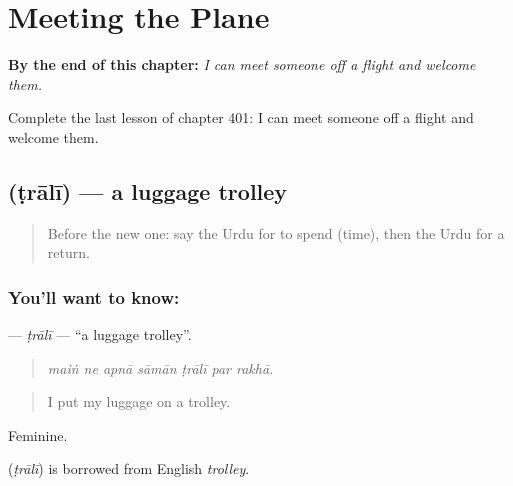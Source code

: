 
\chapter{Meeting the Plane}
\label{ch:ur-meeting-the-plane}

\begin{chapteropening}
\textbf{By the end of this chapter:} \emph{I can meet someone off a flight and welcome them.}

Complete the last lesson of chapter 401: I can meet someone off a flight and welcome them.
\end{chapteropening}

\section[\texorpdfstring{\ur{ٹرالی} (ṭrālī)}{ٹرالی (ṭrālī)}]{ (ṭrālī) — a luggage trolley}

\label{lesson:UR-C401-trali}



\begin{quote}
Before the new one: say the Urdu for to spend (time), then the Urdu for a return.
\end{quote}

\subsection*{You'll want to know: }
\textbf{} — \emph{ṭrālī} — \textquotedblleft{}a luggage trolley\textquotedblright{}.

\begin{quote}
      
\end{quote}

\begin{quote}
\emph{maiṅ ne apnā sāmān ṭrālī par rakhā.}
\end{quote}

\begin{quote}
I put my luggage on a trolley.
\end{quote}

Feminine.

\begin{cousinweb}
\textbf{} (\emph{ṭrālī}) is borrowed from English \emph{trolley}.
\end{cousinweb}

